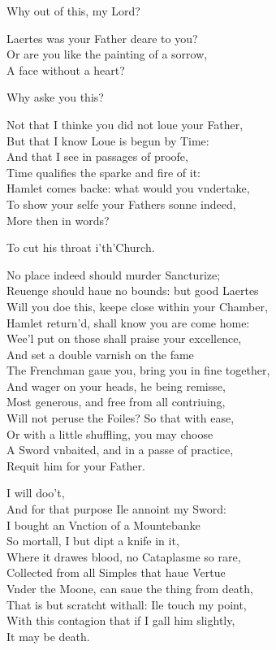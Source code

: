 \documentclass[a5paper,DIV=calc,11pt]{scrbook}
\begin{document}
\begin{drama*}
    \laerspeaks Why out of this, my Lord?
    
    \kingspeaks Laertes was your Father deare to you?\\
    Or are you like the painting of a sorrow,\\
    A face without a heart?
    
    \laerspeaks Why aske you this?
    
    \kingspeaks Not that I thinke you did not loue your Father,\\
    But that I know Loue is begun by Time:\\
    And that I see in passages of proofe,\\
    Time qualifies the sparke and fire of it:\\
    Hamlet comes backe: what would you vndertake,\\
    To show your selfe your Fathers sonne indeed,\\
    More then in words?
    
    \laerspeaks To cut his throat i'th'Church.
    
    \kingspeaks No place indeed should murder Sancturize;\\
    Reuenge should haue no bounds: but good Laertes\\
    Will you doe this, keepe close within your Chamber,\\
    Hamlet return'd, shall know you are come home:\\
    Wee'l put on those shall praise your excellence,\\
    And set a double varnish on the fame\\
    The Frenchman gaue you, bring you in fine together,\\
    And wager on your heads, he being remisse,\\
    Most generous, and free from all contriuing,\\
    Will not peruse the Foiles? So that with ease,\\
    Or with a little shuffling, you may choose\\
    A Sword vnbaited, and in a passe of practice,\\
    Requit him for your Father.
    
    \laerspeaks I will doo't,\\
    And for that purpose Ile annoint my Sword:\\
    I bought an Vnction of a Mountebanke\\
    So mortall, I but dipt a knife in it,\\
    Where it drawes blood, no Cataplasme so rare,\\
    Collected from all Simples that haue Vertue\\
    Vnder the Moone, can saue the thing from death,\\
    That is but scratcht withall: Ile touch my point,\\
    With this contagion that if I gall him slightly,\\
    It may be death.
    

\end{drama*}
\end{document}
